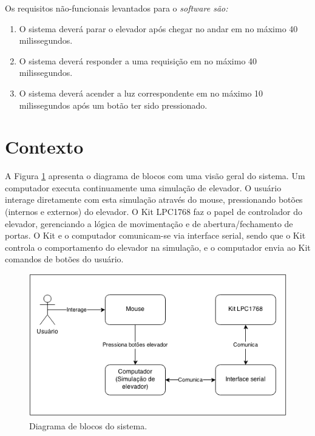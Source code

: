 Os requisitos não-funcionais levantados para o \it{software} são:

\begin{enumerate}[label=RNF \arabic*. , ref=\arabic*]
	\item O sistema deverá parar o elevador após chegar no andar em no máximo 40 milissegundos.
  \item O sistema deverá responder a uma requisição em no máximo 40 milissegundos.
  \item O sistema deverá acender a luz correspondente em no máximo 10 milissegundos após um botão ter sido pressionado.
\end{enumerate}


\section{Contexto}

A Figura \ref{fig:diagrama_blocos} apresenta o diagrama de blocos com uma visão geral do sistema. Um computador executa continuamente uma simulação de elevador. O usuário interage diretamente com esta simulação através do mouse, pressionando botões (internos e externos) do elevador. O Kit LPC1768 faz o papel de controlador do elevador, gerenciando a lógica de movimentação e de abertura/fechamento de portas. O Kit e o computador comunicam-se via interface serial, sendo que o Kit controla o comportamento do elevador na simulação, e o computador envia ao Kit comandos de botões do usuário. 

\begin{figure}[h]
\begin{center}
    \includegraphics[width=0.8\columnwidth]{./figures/diagrama_blocos.png}
    \caption{Diagrama de blocos do sistema.}
    \label{fig:diagrama_blocos}
\end{center}
\end{figure}

